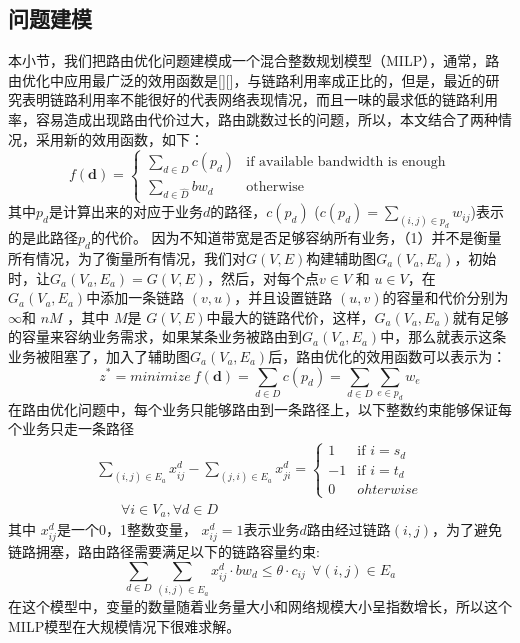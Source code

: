 \subsection{问题建模}
本小节，我们把路由优化问题建模成一个混合整数规划模型（MILP），通常，路由优化中应用最广泛的效用函数是[][]，与链路利用率成正比的，但是，最近的研究表明链路利用率不能很好的代表网络表现情况，而且一味的最求低的链路利用率，容易造成出现路由代价过大，路由跳数过长的问题，所以，本文结合了两种情况，采用新的效用函数，如下：
\begin{equation}\label{Obj1}
f(\mathbf{d})=\begin{cases}
\sum\limits_{d \in D} c(p_d) & \text{if available bandwidth is enough}\\
\sum\limits_{d \in \hat{D}} bw_{d}& \text{otherwise
}
\end{cases}
\end{equation}
其中$p_d$是计算出来的对应于业务$d$的路径，$c(p_d)$ ($c(p_d) = \sum_{(i,j)\in p_d} w_{ij}$)表示的是此路径$p_d$的代价。
因为不知道带宽是否足够容纳所有业务，（1）并不是衡量所有情况，为了衡量所有情况，我们对$G(V, E)$构建辅助图$G_a(V_a, E_a)$，初始时，让$G_a(V_a, E_a) = G(V, E)$，然后，对每个点$v \in V$ 和 $u \in V$，在$G_a(V_a, E_a)$中添加一条链路 $(v, u)$，并且设置链路 $(u,v)$的容量和代价分别为 $\infty$和 $nM$ ，其中 $M$是 $G(V, E)$中最大的链路代价，这样，$G_a(V_a, E_a)$就有足够的容量来容纳业务需求，如果某条业务被路由到$G_a(V_a, E_a)$中，那么就表示这条业务被阻塞了，加入了辅助图$G_a(V_a, E_a)$后，路由优化的效用函数可以表示为：
\begin{equation}\label{Obj2}
z^* = minimize~f(\mathbf{d})=
\sum\limits_{d \in D} c(p_d)=  \sum\limits_{d \in D}\sum\limits_{e \in p_d} w_e
\end{equation}
在路由优化问题中，每个业务只能够路由到一条路径上，以下整数约束能够保证每个业务只走一条路径
\begin{equation}\label{FlowConv}
\begin{split}
\sum\limits_{(i,j) \in E_a} x_{ij}^d - \sum\limits_{(j,i) \in E_a} x_{ji}^d
=\begin{cases}
1 & \text{if $i = s_d$}\\
-1 & \text{if $i = t_d$} \\
0 &{ohterwise}
\end{cases}
\\~~~~~~~~\forall i\in V_a, \forall d\in D
\end{split}
\end{equation}
其中 $x_{ij}^d$是一个0，1整数变量， $x_{ij}^d=1$表示业务$d$路由经过链路$(i,j)$，为了避免链路拥塞，路由路径需要满足以下的链路容量约束:
\begin{equation}\label{Capcon}
\sum\limits_{d \in D}\sum\limits_{(i,j) \in E_a} x_{ij}^d \cdot bw_d \le \theta\cdot c_{ij} ~~\forall (i,j)\in E_a
\end{equation}
在这个模型中，变量的数量随着业务量大小和网络规模大小呈指数增长，所以这个MILP模型在大规模情况下很难求解。
